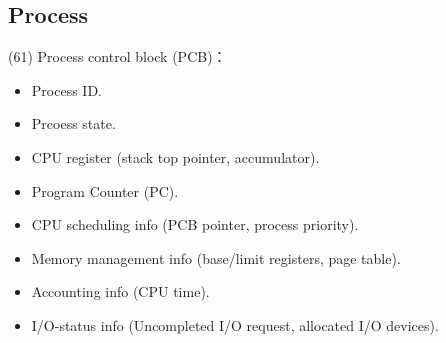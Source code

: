 \subsection{Process}

\begin{theorem}{(61)} Process control block (PCB)：\begin{itemize}
        \item Process ID.
        \item Prcoess state.
        \item CPU register (stack top pointer, accumulator).
        \item Program Counter (PC).
        \item CPU scheduling info (PCB pointer, process priority).
        \item Memory management info (base/limit registers, page table).
        \item Accounting info (CPU time).
        \item I/O-status info (Uncompleted I/O request, allocated I/O devices).
    \end{itemize}
\end{theorem}

